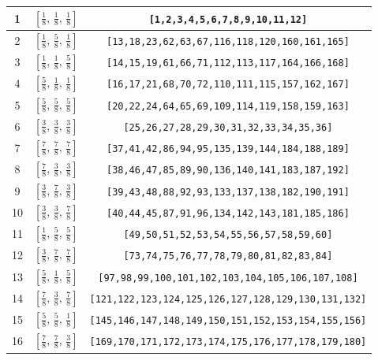 \documentclass[fleqn,8pt]{jsarticle}
\begin{document}
\begin{longtable}{ccc}
1 & $\left[ \frac{1}{8},\, \frac{1}{8},\, \frac{1}{8} \right]$ & {\tt [1,2,3,4,5,6,7,8,9,10,11,12]} \\ \hline
2 & $\left[ \frac{1}{8},\, \frac{5}{8},\, \frac{1}{8} \right]$ & {\tt [13,18,23,62,63,67,116,118,120,160,161,165]} \\ \hline
3 & $\left[ \frac{1}{8},\, \frac{1}{8},\, \frac{5}{8} \right]$ & {\tt [14,15,19,61,66,71,112,113,117,164,166,168]} \\ \hline
4 & $\left[ \frac{5}{8},\, \frac{1}{8},\, \frac{1}{8} \right]$ & {\tt [16,17,21,68,70,72,110,111,115,157,162,167]} \\ \hline
5 & $\left[ \frac{5}{8},\, \frac{5}{8},\, \frac{5}{8} \right]$ & {\tt [20,22,24,64,65,69,109,114,119,158,159,163]} \\ \hline
6 & $\left[ \frac{3}{8},\, \frac{3}{8},\, \frac{3}{8} \right]$ & {\tt [25,26,27,28,29,30,31,32,33,34,35,36]} \\ \hline
7 & $\left[ \frac{7}{8},\, \frac{7}{8},\, \frac{7}{8} \right]$ & {\tt [37,41,42,86,94,95,135,139,144,184,188,189]} \\ \hline
8 & $\left[ \frac{7}{8},\, \frac{3}{8},\, \frac{3}{8} \right]$ & {\tt [38,46,47,85,89,90,136,140,141,183,187,192]} \\ \hline
9 & $\left[ \frac{3}{8},\, \frac{7}{8},\, \frac{3}{8} \right]$ & {\tt [39,43,48,88,92,93,133,137,138,182,190,191]} \\ \hline
10 & $\left[ \frac{3}{8},\, \frac{3}{8},\, \frac{7}{8} \right]$ & {\tt [40,44,45,87,91,96,134,142,143,181,185,186]} \\ \hline
11 & $\left[ \frac{1}{8},\, \frac{5}{8},\, \frac{5}{8} \right]$ & {\tt [49,50,51,52,53,54,55,56,57,58,59,60]} \\ \hline
12 & $\left[ \frac{3}{8},\, \frac{7}{8},\, \frac{7}{8} \right]$ & {\tt [73,74,75,76,77,78,79,80,81,82,83,84]} \\ \hline
13 & $\left[ \frac{5}{8},\, \frac{1}{8},\, \frac{5}{8} \right]$ & {\tt [97,98,99,100,101,102,103,104,105,106,107,108]} \\ \hline
14 & $\left[ \frac{7}{8},\, \frac{3}{8},\, \frac{7}{8} \right]$ & {\tt [121,122,123,124,125,126,127,128,129,130,131,132]} \\ \hline
15 & $\left[ \frac{5}{8},\, \frac{5}{8},\, \frac{1}{8} \right]$ & {\tt [145,146,147,148,149,150,151,152,153,154,155,156]} \\ \hline
16 & $\left[ \frac{7}{8},\, \frac{7}{8},\, \frac{3}{8} \right]$ & {\tt [169,170,171,172,173,174,175,176,177,178,179,180]} \\
\end{longtable}
\end{document}
